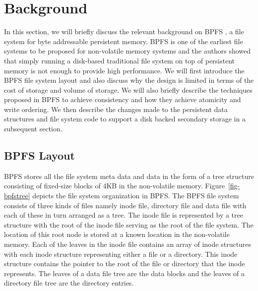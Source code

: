 \section{Background}
\label{sec-bg}
In this section, we will briefly discuss the relevant background on BPFS \cite{c10}, a file system for byte addressable persistent memory. BPFS is one of the earliest file systems to be proposed for non-volatile memory systems and the authors showed that simply running a disk-based traditional file system on top of persistent memory is not enough to provide high performance. We will first introduce the BPFS file system layout and also discuss why the design is limited in terms of the cost of storage and volume of storage. We will also briefly describe the techniques proposed in BPFS to achieve consistency and how they achieve atomicity and write ordering. We then describe the changes made to the persistent data structures and file system code to support a disk backed secondary storage in a subsequent section.

\subsection{BPFS Layout}
BPFS stores all the file system meta data and data in the form of a tree structure consisting of fixed-size blocks of 4KB in the non-volatile memory. Figure~\ref{fig-bpfstree} depicts the file system organization in BPFS. The BPFS file system consists of three kinds of files namely inode file, directory file and data file with each of these in turn arranged as a tree. The inode file is represented by a tree structure with the root of the inode file serving as the root of the file system. The location of this root node is stored at a known location in the non-volatile memory. Each of the leaves in the inode file contains an array of inode structures with each inode structure representing either a file or a directory. This inode structure contains the pointer to the root of the file or directory that the inode represents. The leaves of a data file tree are the data blocks and the leaves of a directory file tree are the directory entries.

